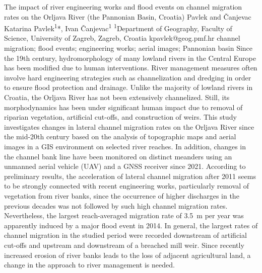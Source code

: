 \abstract
{The impact of river engineering works and flood events on channel migration rates on the Orljava River (the Pannonian Basin, Croatia)} 
{Pavlek and Čanjevac} 
{Katarina Pavlek\textsuperscript{1}*, Ivan Čanjevac\textsuperscript{1}} 
{\TLtag} 
{
\textsuperscript{1}Department of Geography, Faculty of Science, University of Zagreb, Zagreb, Croatia
}
{kpavlek@geog.pmf.hr}  %
{channel migration; flood events; engineering works; aerial images; Pannonian basin}
{Since the 19th century, hydromorphology of many lowland rivers in the Central Europe has been modified due to human interventions. River management measures often involve hard engineering strategies such as channelization and dredging in order to ensure flood protection and drainage. Unlike the majority of lowland rivers in Croatia, the Orljava River has not been extensively channelized. Still, its morphodynamics has been under significant human impact due to removal of riparian vegetation, artificial cut-offs, and construction of weirs. This study investigates changes in lateral channel migration rates on the Orljava River since the mid-20th century based on the analysis of topographic maps and aerial images in a GIS environment on selected river reaches. In addition, changes in the channel bank line have been monitored on distinct meanders using an unmanned aerial vehicle (UAV) and a GNSS receiver since 2021. According to preliminary results, the acceleration of lateral channel migration after 2011 seems to be strongly connected with recent engineering works, particularly removal of vegetation from river banks, since the occurrence of higher discharges in the previous decades was not followed by such high channel migration rates. Nevertheless, the largest reach-averaged migration rate of 3.5~m per year was apparently induced by a major flood event in 2014. In general, the largest rates of channel migration in the studied period were recorded downstream of artificial cut-offs and upstream and downstream of a breached mill weir. Since recently increased erosion of river banks leads to the loss of adjacent agricultural land, a change in the approach to river management is needed.
}
{
}

